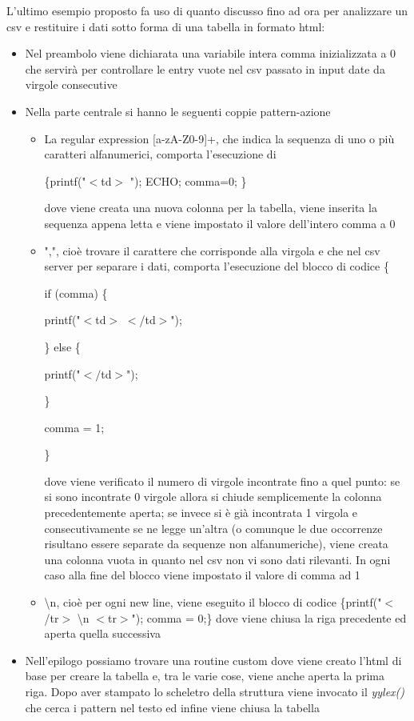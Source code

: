 \documentclass[class=book, crop=false, oneside, 12pt]{standalone}
\begin{document}
L'ultimo esempio proposto fa uso di quanto discusso fino ad ora per analizzare un csv e restituire i dati sotto forma di una tabella in formato html:

\begin{itemize}
    \item Nel preambolo viene dichiarata una variabile intera comma inizializzata a 0 che servirà per controllare le entry vuote nel csv passato in input date da virgole consecutive
    \item Nella parte centrale si hanno le seguenti coppie pattern-azione
    \begin{itemize}
        \item La regular expression [a-zA-Z0-9]+, che indica la sequenza di uno o più caratteri alfanumerici, comporta l'esecuzione di 
        
        \{printf("\(<\)td\(>\) "); ECHO; comma=0; \} 
        
        dove viene creata una nuova colonna per la tabella, viene inserita la sequenza appena letta e viene impostato il valore dell'intero comma a 0
        \item ",", cioè trovare il carattere che corrisponde alla virgola e che nel csv server per separare i dati, comporta l'esecuzione del blocco di codice
        \{
        
        if (comma) \{
        
        printf("\(<\)td\(>\) \(<\)/td\(>\)"); 
        
        \} else \{ 
        
        printf("\(</\)td\(>\)");
        
        \}
            
            comma = 1;
                 
        \}
        
        dove viene verificato il numero di virgole incontrate fino a quel punto: se si sono incontrate 0 virgole allora si chiude semplicemente la colonna precedentemente aperta; se invece si è già incontrata 1 virgola e consecutivamente se ne legge un'altra (o comunque le due occorrenze risultano essere separate da sequenze non alfanumeriche), viene creata una colonna vuota in quanto nel csv non vi sono dati rilevanti. In ogni caso alla fine del blocco viene impostato il valore di comma ad 1
        \item \textbackslash n, cioè per ogni new line, viene eseguito il blocco di codice \{printf("\(<\)/tr\(>\) \textbackslash n \(<\)tr\(>\)"); comma = 0;\} dove viene chiusa la riga precedente ed aperta quella successiva
    \end{itemize}
    \item Nell'epilogo possiamo trovare una routine custom dove viene creato l'html di base per creare la tabella e, tra le varie cose, viene anche aperta la prima riga. Dopo aver stampato lo scheletro della struttura viene invocato il \emph{yylex()} che cerca i pattern nel testo ed infine viene chiusa la tabella
\end{itemize}
\end{document}
